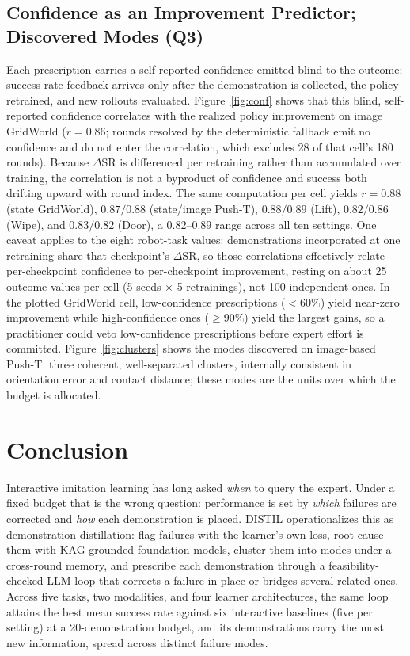 \documentclass[letterpaper]{article} %
\begin{document}
\subsection{Confidence as an Improvement Predictor; Discovered Modes (Q3)}

Each prescription carries a self-reported confidence emitted blind to the
outcome: success-rate feedback arrives only after the demonstration is
collected, the policy retrained, and new rollouts evaluated. Figure~\ref{fig:conf} shows that this blind,
self-reported confidence correlates with the realized policy improvement on
image GridWorld ($r=0.86$; rounds resolved by the deterministic fallback
emit no confidence and do not enter the correlation, which excludes 28 of
that cell's 180 rounds). Because $\Delta$SR is differenced per retraining
rather than accumulated over training, the correlation is not a byproduct
of confidence and success both drifting upward with round index. The same
computation per cell yields $r=0.88$
(state GridWorld), $0.87/0.88$ (state/image Push-T), $0.88/0.89$ (Lift),
$0.82/0.86$ (Wipe), and $0.83/0.82$ (Door), a $0.82$--$0.89$ range across
all ten settings. One caveat applies to the eight robot-task values:
demonstrations incorporated at one retraining share that checkpoint's
$\Delta$SR, so those correlations effectively relate per-checkpoint
confidence to per-checkpoint improvement, resting on about 25 outcome
values per cell (5 seeds $\times$ 5 retrainings), not 100 independent
ones. In the plotted GridWorld cell, low-confidence prescriptions
($<60\%$) yield near-zero improvement while high-confidence ones
($\ge 90\%$) yield the largest gains, so a practitioner could veto
low-confidence prescriptions before expert effort is committed.
Figure~\ref{fig:clusters} shows the modes discovered on image-based Push-T:
three coherent, well-separated clusters, internally consistent in
orientation error and contact distance; these modes are the units over
which the budget is allocated.

\section{Conclusion}
\label{sec:conclusion}

Interactive imitation learning has long asked \emph{when} to query the
expert. Under a fixed budget that is the wrong question: performance is set
by \emph{which} failures are corrected and \emph{how} each demonstration is
placed. DISTIL operationalizes this as demonstration distillation: flag
failures with the learner's own loss, root-cause them with KAG-grounded
foundation models, cluster them into modes under a cross-round memory, and
prescribe each demonstration through a feasibility-checked LLM loop that
corrects a failure in place or bridges several related ones.
Across five tasks, two modalities, and four learner architectures, the
same loop attains the best mean success rate against six interactive
baselines (five per setting) at a 20-demonstration budget, and its
demonstrations carry the most new information, spread across distinct
failure modes.
\end{document}
